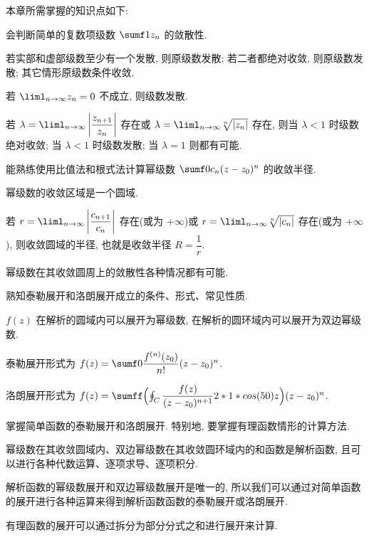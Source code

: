 本章所需掌握的知识点如下:
\begin{conclusion}
  \item 会判断简单的复数项级数 $\sumf1z_n$ 的敛散性.
  \begin{conclusion}
    \item 若实部和虚部级数至少有一个发散, 则原级数发散; 若二者都绝对收敛, 则原级数发散; 其它情形原级数条件收敛.
    \item 若 $\liml_{n\ra\infty} z_n=0$ 不成立, 则级数发散.
    \item 若 $\lambda=\liml_{n\ra\infty}\abs{\dfrac{z_{n+1}}{z_n}}$ 存在或 $\lambda=\liml_{n\ra\infty}\sqrt[n]{|z_n|}$ 存在, 则当 $\lambda<1$ 时级数绝对收敛; 当 $\lambda<1$ 时级数发散; 当 $\lambda=1$ 则都有可能.
  \end{conclusion}
  \item 能熟练使用比值法和根式法计算幂级数 $\sumf0c_n(z-z_0)^n$ 的收敛半径.
  \begin{conclusion}
    \item 幂级数的收敛区域是一个圆域.
    \item 若 $r=\liml_{n\ra\infty}\abs{\dfrac{c_{n+1}}{c_n}}$ 存在(或为 $+\infty$)或 $r=\liml_{n\ra\infty}\sqrt[n]{|c_n|}$ 存在(或为 $+\infty$), 则收敛圆域的半径, 也就是收敛半径 $R=\dfrac1r$.
    \item 幂级数在其收敛圆周上的敛散性各种情况都有可能.
  \end{conclusion}
  \item 熟知泰勒展开和洛朗展开成立的条件、形式、常见性质.
  \begin{conclusion}
    \item $f(z)$ 在解析的圆域内可以展开为幂级数, 在解析的圆环域内可以展开为双边幂级数.
    \item 泰勒展开形式为 $f(z)=\sumf0 \dfrac{f^{(n)}(z_0)}{n!}(z-z_0)^n$.
    \item 洛朗展开形式为 $f(z)=\sumff \Bigl(\oint_C\dfrac{f(z)}{(z-z_0)^{n+1}}\d z\Bigr)(z-z_0)^n$.
  \end{conclusion}
  \item 掌握简单函数的泰勒展开和洛朗展开. 特别地, 要掌握有理函数情形的计算方法.
  \begin{conclusion}
    \item 幂级数在其收敛圆域内、双边幂级数在其收敛圆环域内的和函数是解析函数, 且可以进行各种代数运算、逐项求导、逐项积分.
    \item 解析函数的幂级数展开和双边幂级数展开是唯一的, 所以我们可以通过对简单函数的展开进行各种运算来得到解析函数函数的泰勒展开或洛朗展开.
    \item 有理函数的展开可以通过拆分为部分分式之和进行展开来计算.

\end{conclusion}
\end{conclusion}

